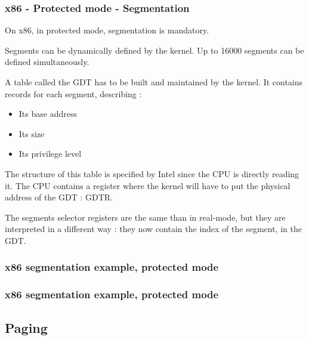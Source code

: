 \begin{frame}
  \frametitle{x86 - Protected mode - Segmentation}

  On x86, in protected mode, segmentation is mandatory. 

  \-

  Segments can be dynamically defined by the kernel. Up to 16000 segments can be defined simultaneously.

  \-

  A table called the GDT has to be built and maintained by the kernel. It contains records for each segment, describing :
  \begin{itemize}
  \item Its base address
  \item Its size
  \item Its privilege level
  \end{itemize}

  The structure of this table is specified by Intel since the CPU is directly reading it. The CPU contains a register where the kernel will have to put the physical address of the GDT : GDTR.

  \-

  The segments selector registers are the same than in real-mode, but they are interpreted in a different way : they now contain the index of the segment, in the GDT.

\end{frame}

\begin{frame}
  \frametitle{x86 segmentation example, protected mode}

  \begin{center}
  \end{center}

\end{frame}

\begin{frame}
  \frametitle{x86 segmentation example, protected mode}

  \begin{center}
  \end{center}

\end{frame}


\subsection{Paging}


